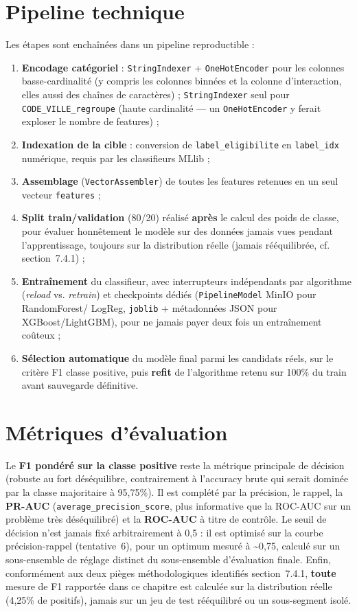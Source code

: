 \documentclass[11pt,a4paper]{report}
\begin{document}
\section{Pipeline technique}
\statutFait
Les étapes sont enchaînées dans un pipeline reproductible :
\begin{enumerate}
  \item \textbf{Encodage catégoriel} : \texttt{StringIndexer} +
  \texttt{OneHotEncoder} pour les colonnes basse-cardinalité (y compris
  les colonnes binnées et la colonne d'interaction, elles aussi des
  chaînes de caractères) ; \texttt{StringIndexer} seul pour
  \texttt{CODE\_VILLE\_regroupe} (haute cardinalité — un
  \texttt{OneHotEncoder} y ferait exploser le nombre de features) ;
  \item \textbf{Indexation de la cible} : conversion de
  \texttt{label\_eligibilite} en \texttt{label\_idx} numérique, requis
  par les classifieurs MLlib ;
  \item \textbf{Assemblage} (\texttt{VectorAssembler}) de toutes les
  features retenues en un seul vecteur \texttt{features} ;
  \item \textbf{Split train/validation} (80/20) réalisé \textbf{après}
  le calcul des poids de classe, pour évaluer honnêtement le modèle sur
  des données jamais vues pendant l'apprentissage, toujours sur la
  distribution réelle (jamais rééquilibrée, cf. section~7.4.1) ;
  \item \textbf{Entraînement} du classifieur, avec interrupteurs
  indépendants par algorithme (\textit{reload} vs. \textit{retrain}) et
  checkpoints dédiés (\texttt{PipelineModel} MinIO pour RandomForest/
  LogReg, \texttt{joblib} + métadonnées JSON pour XGBoost/LightGBM), pour
  ne jamais payer deux fois un entraînement coûteux ;
  \item \textbf{Sélection automatique} du modèle final parmi les
  candidats réels, sur le critère F1 classe positive, puis
  \textbf{refit} de l'algorithme retenu sur 100\% du train avant
  sauvegarde définitive.
\end{enumerate}

\section{Métriques d'évaluation}
\statutFait
Le \textbf{F1 pondéré sur la classe positive} reste la métrique
principale de décision (robuste au fort déséquilibre, contrairement à
l'accuracy brute qui serait dominée par la classe majoritaire à
95,75\%). Il est complété par la précision, le rappel, la \textbf{PR-AUC}
(\texttt{average\_precision\_score}, plus informative que la ROC-AUC sur
un problème très déséquilibré) et la \textbf{ROC-AUC} à titre de contrôle.
Le seuil de décision n'est jamais fixé arbitrairement à 0,5 : il est
optimisé sur la courbe précision-rappel (tentative~6), pour un optimum
mesuré à \textasciitilde 0,75, calculé sur un sous-ensemble de réglage
distinct du sous-ensemble d'évaluation finale. Enfin, conformément aux
deux pièges méthodologiques identifiés section~7.4.1, \textbf{toute}
mesure de F1 rapportée dans ce chapitre est calculée sur la distribution
réelle (4,25\% de positifs), jamais sur un jeu de test rééquilibré ou un
sous-segment isolé.
\end{document}
